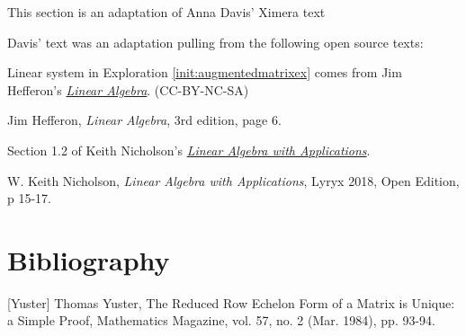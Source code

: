 \documentclass{ximera}
\begin{document}
This section is an adaptation of Anna Davis' Ximera text %

Davis' text was an adaptation pulling from the following open source texts:
 
Linear system in Exploration \ref{init:augmentedmatrixex} comes from Jim Hefferon's \href{http://joshua.smcvt.edu/linearalgebra/#current_version}{\it Linear Algebra}. (CC-BY-NC-SA)
 
Jim Hefferon, {\it Linear Algebra}, 3rd edition, page 6.

 Section 1.2 of Keith Nicholson's \href{https://open.umn.edu/opentextbooks/textbooks/linear-algebra-with-applications}{\it Linear Algebra with Applications}.
 
W. Keith Nicholson, {\it Linear Algebra with Applications}, Lyryx 2018, Open Edition, p 15-17.
 
\section*{Bibliography}
 
[Yuster] Thomas Yuster, The Reduced Row Echelon Form of a Matrix is Unique: a
Simple Proof, Mathematics Magazine, vol. 57, no. 2 (Mar. 1984), pp. 93-94.
 
\end{document}
